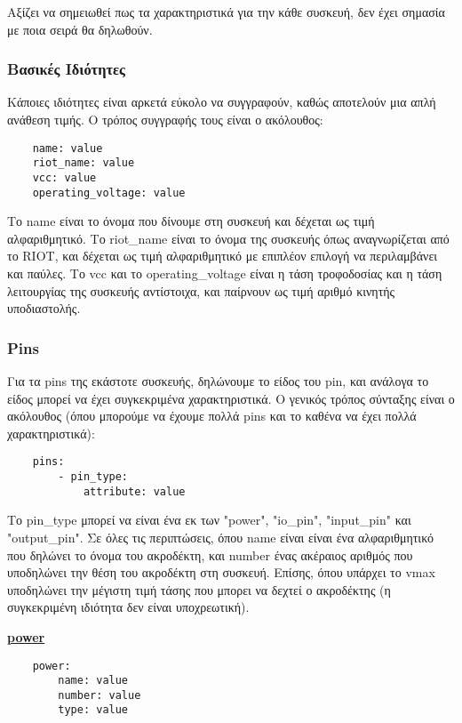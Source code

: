 Αξίζει να σημειωθεί πως τα χαρακτηριστικά για την κάθε συσκευή, δεν έχει σημασία με ποια σειρά θα δηλωθούν.

\subsubsection{Βασικές Ιδιότητες}
Κάποιες ιδιότητες είναι αρκετά εύκολο να συγγραφούν, καθώς αποτελούν μια απλή ανάθεση τιμής. Ο τρόπος συγγραφής τους είναι ο ακόλουθος:

\begin{lstlisting}
	name: value
	riot_name: value
	vcc: value
	operating_voltage: value
\end{lstlisting}

Το name είναι το όνομα που δίνουμε στη συσκευή και δέχεται ως τιμή αλφαριθμητικό. Το riot\_name είναι το όνομα της συσκευής όπως αναγνωρίζεται από το RIOT, και δέχεται ως τιμή αλφαριθμητικό με επιπλέον επιλογή να περιλαμβάνει και παύλες. Το vcc και το operating\_voltage είναι η τάση τροφοδοσίας και η τάση λειτουργίας της συσκευής αντίστοιχα, και παίρνουν ως τιμή αριθμό κινητής υποδιαστολής.

\subsubsection{Pins}

Για τα pins της εκάστοτε συσκευής, δηλώνουμε το είδος του pin, και ανάλογα το είδος μπορεί να έχει συγκεκριμένα χαρακτηριστικά. Ο γενικός τρόπος σύνταξης είναι ο ακόλουθος (όπου μπορούμε να έχουμε πολλά pins και το καθένα να έχει πολλά χαρακτηριστικά):

\begin{lstlisting}
	pins:
		- pin_type:
			attribute: value
\end{lstlisting}

Το pin\_type μπορεί να είναι ένα εκ των "power", "io\_pin", "input\_pin" και "output\_pin". Σε όλες τις περιπτώσεις, όπου name είναι είναι ένα αλφαριθμητικό που δηλώνει το όνομα του ακροδέκτη, και number ένας ακέραιος αριθμός που υποδηλώνει την θέση του ακροδέκτη στη συσκευή. Επίσης, όπου υπάρχει το vmax υποδηλώνει την μέγιστη τιμή τάσης που μπορει να δεχτεί ο ακροδέκτης (η συγκεκριμένη ιδιότητα δεν είναι υποχρεωτική).

\textbf{\underline{power}}

\begin{lstlisting}
	power:
		name: value
		number: value
		type: value
\end{lstlisting}

